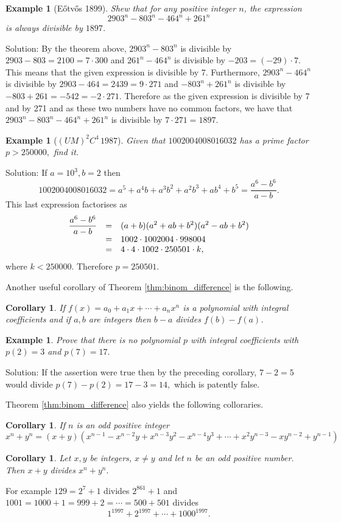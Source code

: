 \documentclass[11pt, openany]{book}
\theoremstyle{change} \theoremheaderfont{\blue\sffamily\bfseries}
\newtheorem{cor}[thm]{Corollary}
\newtheorem{exa}[thm]{Example}
\theoremstyle{nonumberplain} \theoremheaderfont{\sffamily\bfseries}
\newcommand{\í}{\'{\i}}
\begin{document}
\begin{exa}[E\H{o}tv\H{o}s 1899] Shew that for any positive integer $n$, the expression
$$2903^n - 803^n - 464^n + 261^n$$is always divisible by $1897$.\end{exa}
Solution: By the theorem above, $2903^n - 803^n$ is divisible by
$2903 - 803 = 2100 = 7\cdot 300$ and $261^n - 464^n$ is divisible
by $-203 = (-29)\cdot 7$. This means that the given expression is
divisible by 7. Furthermore, $2903^n - 464^n$ is divisible by
$2903 - 464 = 2439 = 9\cdot 271$ and $-803^n + 261^n$ is divisible
by $-803  + 261 = -542 = -2\cdot 271$. Therefore as the given
expression is divisible by  7 and by 271 and as these two numbers
have no common factors, we have that $2903^n - 803^n - 464^n +
261^n$ is divisible by $7\cdot 271 = 1897.$

\begin{exa}[$(UM)^2 C^4 \, 1987$] Given that $1002004008016032$ has a
prime factor $p > 250000,$ find it. \end{exa} Solution: If $a =
10^3 , b = 2$ then $$ 1002004008016032 = a^5 + a^4 b + a^3 b^2 +
a^2 b^3 + ab^4 + b^5 = \frac{ a^6 - b^6 }{ a - b }. $$ This last
expression factorises as $$ {\everymath{\displaystyle}
\begin{array}{lcl}\frac{a^6 -
b^6}{a - b} & = & (a + b)(a^2 + ab + b^2)(a^2 - ab + b^2 ) \\
&  = & 1002\cdot 1002004\cdot 998004 \\
& = & 4\cdot 4\cdot 1002\cdot 250501 \cdot k,\end{array} }$$where
$k < 250000$. Therefore $p = 250501$.


Another useful corollary of Theorem \ref{thm:binom_difference} is
the following.
\begin{cor}
If $f(x) = a_0 + a_1x + \cdots + a_nx^n$ is a polynomial with
integral coefficients and if $a, b$ are integers then $b  - a$
divides $f(b) - f(a)$.
\end{cor}

\begin{exa}
Prove that there is no polynomial $p$ with integral coefficients
with $p(2) = 3$ and $p(7) = 17.$
\end{exa}
Solution: If the assertion were true then by the preceding
corollary, $7 - 2 = 5$ would divide $p(7) - p(2) = 17 - 3 = 14,$
which is patently false.



Theorem \ref{thm:binom_difference} also yields  the following
colloraries.
\begin{cor}If  $n$ is an odd positive integer
\begin{equation}
x^n + y^n = (x + y)(x^{n - 1} - x^{n - 2}y + x^{n - 3}y^2 - x^{n -
4}y^3 +  \cdots + x^2y^{n - 3} - xy^{n - 2} + y^{n - 1})
\end{equation}
\end{cor}
\begin{cor}
Let  $x, y$ be integers, $x \neq y$ and let $n$ be an odd positive
number. Then $x + y$ divides  $x^n + y^n.$
\end{cor}
For example $129 = 2^7 + 1$ divides $2^{861} + 1$ and $1001 = 1000
+ 1 = 999 + 2 = \cdots = 500 + 501$ divides
$$1^{1997} + 2^{1997} + \cdots + 1000^{1997}.$$
\end{document}

